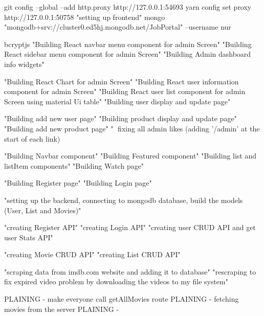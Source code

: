 git config --global --add http.proxy http://127.0.0.1:54693
yarn config set proxy http://127.0.0.1:50758
"setting up frontend"
mongo "mongodb+srv://cluster0.ed5hj.mongodb.net/JobPortal" --username nur

bcryptjs
"Building React navbar menu component for admin Screen"
"Building React sidebar menu component for admin Screen"
"Building Admin dashboard info widgets"

"Building React Chart for admin Screen"
"Building React user information component for admin Screen"
"Building React user list component for admin Screen using material Ui table"
"Building user display and update page"

"Building add new user page"
"Building product display and update page"
"Building add new product page"
"🔨 fixing all admin likes (adding '/admin' at the start of each link)

"Building Navbar component"
"Building Featured component"
"Building list and listItem components"
"Building Watch page"

"Building Register page"
"Building Login page"

"setting up the backend, connecting to mongodb database, build the models (User, List and Movies)"

"creating Register API"
"creating Login API"
"creating user CRUD API and get user Stats API"

"creating Movie CRUD API"
"creating List CRUD API"

"scraping data from imdb.com website and adding it to database"
"rescraping to fix expired video problem by downloading the videos to my file system"

PLAINING - make everyone call getAllMovies route
PLAINING - fetching movies from the server
PLAINING - 